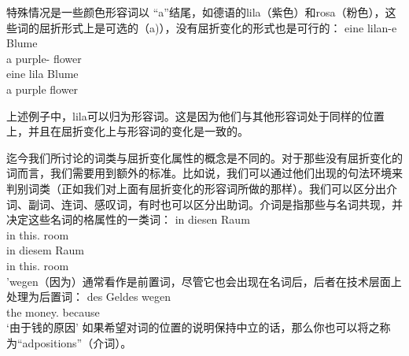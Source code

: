 特殊情况是一些颜色形容词以 “a”结尾，如德语的lila（紫色）和rosa（粉色），这些词的屈折形式上是可选的（a)），没有屈折变化的形式也是可行的：
\eal
\ex 
\gll eine lilan-e Blume\\
	 a purple-\fem{} flower\\
\ex 
\gll eine lila Blume\\
	 a purple flower\\
\zl

\noindent
上述例子中，lila可以归为形容词。这是因为他们与其他形容词处于同样的位置上，并且在屈折变化上与形容词的变化是一致的。

迄今我们所讨论的词类与屈折变化属性的概念是不同的。对于那些没有屈折变化的词而言，我们需要用到额外的标准。比如说，我们可以通过他们出现的句法环境来判别词类（正如我们对上面有屈折变化的形容词所做的那样）。我们可以区分出介词、副词、连词、感叹词，有时也可以区分出助词。介词是指那些与名词共现，并决定这些名词的格属性的一类词：
\eal
\ex 
\gll in diesen Raum\\
	 in this.\acc{} room\\
\ex 
\gll in diesem Raum\\
	 in this.\dat{} room\\
\zl
'wegen（因为）通常看作是前置词，尽管它也会出现在名词后，后者在技术层面上处理为后置词：
\ea
\gll des Geldes wegen\\
	 the money.\gen{} because\\
\glt `由于钱的原因'
\z
如果希望对词的位置的说明保持中立的话，那么你也可以将之称为“adpositions”（介词）。

